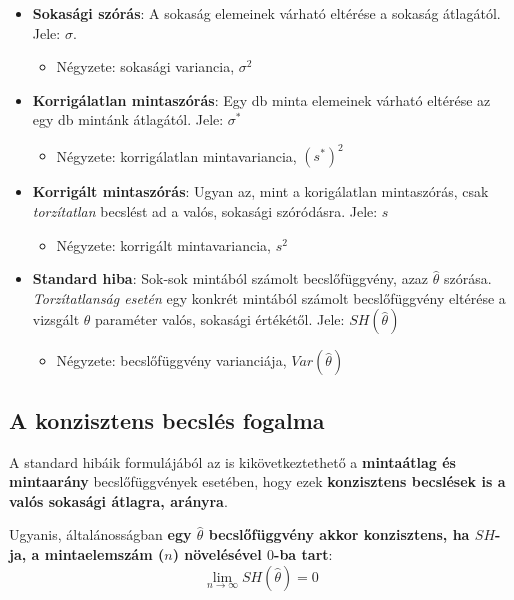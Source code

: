 \documentclass[
]{book}
\providecommand{\tightlist}{%
  \setlength{\itemsep}{0pt}\setlength{\parskip}{0pt}}
\begin{document}
\begin{itemize}
\tightlist
\item
  \textbf{Sokasági szórás}: A sokaság elemeinek várható eltérése a sokaság átlagától. Jele: \(\sigma\).

  \begin{itemize}
  \tightlist
  \item
    Négyzete: sokasági variancia, \(\sigma^2\)
  \end{itemize}
\item
  \textbf{Korrigálatlan mintaszórás}: Egy db minta elemeinek várható eltérése az egy db mintánk átlagától. Jele: \(\sigma^*\)

  \begin{itemize}
  \tightlist
  \item
    Négyzete: korrigálatlan mintavariancia, \((s^*)^2\)
  \end{itemize}
\item
  \textbf{Korrigált mintaszórás}: Ugyan az, mint a korigálatlan mintaszórás, csak \emph{torzítatlan} becslést ad a valós, sokasági szóródásra. Jele: \(s\)

  \begin{itemize}
  \tightlist
  \item
    Négyzete: korrigált mintavariancia, \(s^2\)
  \end{itemize}
\item
  \textbf{Standard hiba}: Sok-sok mintából számolt becslőfüggvény, azaz \(\hat{\theta}\) szórása. \emph{Torzítatlanság esetén} egy konkrét mintából számolt becslőfüggvény eltérése a vizsgált \(\theta\) paraméter valós, sokasági értékétől. Jele: \(SH(\hat{\theta})\)

  \begin{itemize}
  \tightlist
  \item
    Négyzete: becslőfüggvény varianciája, \(Var(\hat{\theta})\)
  \end{itemize}
\end{itemize}

\subsection{A konzisztens becslés fogalma}\label{a-konzisztens-becsluxe9s-fogalma}

A standard hibáik formulájából az is kikövetkeztethető a \textbf{mintaátlag és mintaarány} becslőfüggvények esetében, hogy ezek \textbf{konzisztens becslések is a valós sokasági átlagra, arányra}.

Ugyanis, általánosságban \textbf{egy \(\hat{\theta}\) becslőfüggvény akkor konzisztens, ha \(SH\)-ja, a mintaelemszám (\(n\)) növelésével \(0\)-ba tart}:\[\lim_{n \rightarrow \infty}{SH(\hat{\theta})} = 0\]
\end{document}
